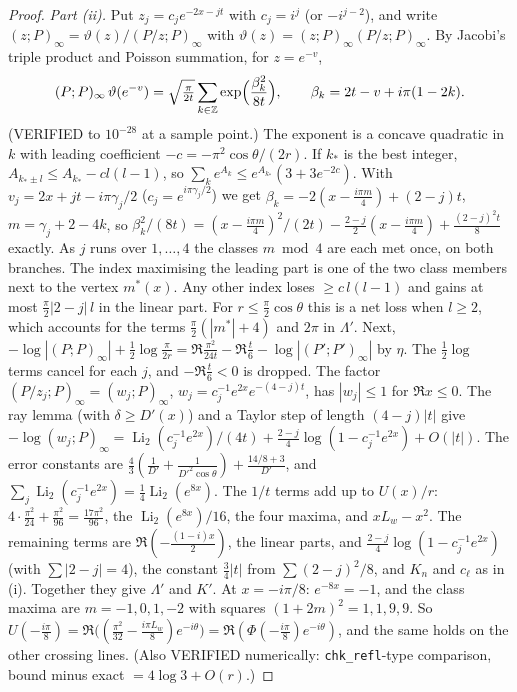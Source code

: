 \begin{proof}
\emph{Part \textup{(ii)}.} Put $z_j=c_je^{-2x-jt}$ with $c_j=i^j$ (or $-i^{j-2}$), and write
$(z;P)_\infty=\vartheta(z)/(P/z;P)_\infty$ with $\vartheta(z)=(z;P)_\infty(P/z;P)_\infty$. By Jacobi's triple
product and Poisson summation, for $z=e^{-v}$,
\[
 (P;P)_\infty\,\vartheta(e^{-v})=\sqrt{\tfrac{\pi}{2t}}\sum_{k\in\mathbb Z}
 \exp\Bigl(\frac{\beta_k^2}{8t}\Bigr),\qquad \beta_k=2t-v+i\pi(1-2k).
\]
(VERIFIED to $10^{-28}$ at a sample point.) The exponent is a concave quadratic in $k$ with leading
coefficient $-c=-\pi^2\cos\theta/(2r)$. If $k_\ast$ is the best integer, $A_{k_\ast\pm l}\le A_{k_\ast}-cl(l-1)$,
so $\sum_ke^{A_k}\le e^{A_{k_\ast}}(3+3e^{-2c})$. With $v_j=2x+jt-i\pi\gamma_j/2$ ($c_j=e^{i\pi\gamma_j/2}$) we get
$\beta_k=-2(x-\frac{i\pi m}4)+(2-j)t$, $m=\gamma_j+2-4k$, so
$\beta_k^2/(8t)=(x-\frac{i\pi m}4)^2/(2t)-\frac{2-j}2(x-\frac{i\pi m}4)+\frac{(2-j)^2t}8$ exactly. As $j$ runs
over $1,\dots,4$ the classes $m\bmod4$ are each met once, on both branches. The index maximising the
leading part is one of the two class members next to the vertex $m^\ast(x)$. Any other index loses
$\ge c\,l(l-1)$ and gains at most $\frac\pi2|2-j|\,l$ in the linear part. For $r\le\frac\pi2\cos\theta$ this is
a net loss when $l\ge2$, which accounts for the terms $\frac\pi2(|m^\ast|+4)$ and $2\pi$ in $\Lambda'$. Next,
$-\log|(P;P)_\infty|+\frac12\log\frac\pi{2r}=\Re\frac{\pi^2}{24t}-\Re\frac t6-\log|(P';P')_\infty|$ by $\eta$. The
$\frac12\log$ terms cancel for each $j$, and $-\Re\frac t6<0$ is dropped. The factor $(P/z_j;P)_\infty=(w_j;P)_\infty$,
$w_j=c_j^{-1}e^{2x}e^{-(4-j)t}$, has $|w_j|\le1$ for $\Re x\le0$. The ray lemma (with $\delta\ge D'(x)$) and a
Taylor step of length $(4-j)|t|$ give
$-\log(w_j;P)_\infty=\operatorname{Li}_2(c_j^{-1}e^{2x})/(4t)+\frac{2-j}4\log(1-c_j^{-1}e^{2x})+O(|t|)$. The error
constants are $\frac43(\frac1{D'}+\frac1{D'^2\cos\theta})+\frac{14/8+3}{D'}$, and
$\sum_j\operatorname{Li}_2(c_j^{-1}e^{2x})=\frac14\operatorname{Li}_2(e^{8x})$. The $1/t$ terms add up to $U(x)/r$:
$4\cdot\frac{\pi^2}{24}+\frac{\pi^2}{96}=\frac{17\pi^2}{96}$, the $\operatorname{Li}_2(e^{8x})/16$, the four maxima,
and $xL_w-x^2$. The remaining terms are $\Re(-\frac{(1-i)x}2)$, the linear parts, and
$\frac{2-j}4\log(1-c_j^{-1}e^{2x})$ (with $\sum|2-j|=4$), the constant $\frac34|t|$ from
$\sum(2-j)^2/8$, and $K_n$ and $c_\ell$ as in (i). Together they give $\Lambda'$ and $K'$. At
$x=-i\pi/8$: $e^{-8x}=-1$, and the class maxima are $m=-1,0,1,-2$ with squares
$(1+2m)^2=1,1,9,9$. So $U(-\frac{i\pi}8)=\Re\bigl((\frac{\pi^2}{32}-\frac{i\pi L_w}8)e^{-i\theta}\bigr)
=\Re(\Phi(-\frac{i\pi}8)e^{-i\theta})$, and the same holds on the other crossing lines. (Also VERIFIED numerically: \texttt{chk\_refl}-type comparison,
bound minus exact $=4\log3+O(r)$.)


\end{proof}
